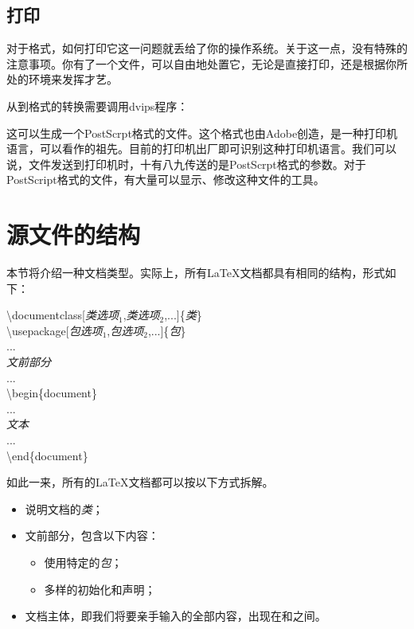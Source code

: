 \subsection{打印}

对于格式，如何打印它这一问题就丢给了你的操作系统。关于这一点，没有特殊的注意事项。你有了一个文件，可以自由地处置它，无论是直接打印，还是根据你所处的环境来发挥才艺。

\begin{exclamation}
    从到格式的转换需要调用dvips程序：


    这可以生成一个PostScrpt格式的文件。这个格式也由Adobe创造，是一种打印机语言，可以看作的祖先。目前的打印机出厂即可识别这种打印机语言。我们可以说，文件发送到打印机时，十有八九传送的是PostScrpt格式的参数。对于PostScript格式的文件，有大量可以显示、修改这种文件的工具。
\end{exclamation}

\section{源文件的结构}

本节将介绍一种文档类型。实际上，所有\LaTeX 文档都具有相同的结构，形式如下：

\begin{dmd}
\backslash documentclass[\textsl{\<类选项$_1$\>},\textsl{\<类选项$_2$\>},...]\{\textsl{\<类\>}\}\\
\backslash usepackage[\textsl{\<包选项$_1$\>},\textsl{\<包选项$_2$\>},...]\{\textsl{\<包\>}\}\\
...\\
\textsl{\<文前部分\>}\\
...\\
\backslash begin\{document\}\\
...\\
\textsl{\<文本\>}\\
...\\
\backslash end\{document\}
\end{dmd}

如此一来，所有的\LaTeX 文档都可以按以下方式拆解。

\begin{itemize}
    \item 说明文档的\textsl{\<类\>}；
    \item 文前部分，包含以下内容：
        \begin{itemize}
            \item 使用特定的\textsl{\<包\>}；
            \item 多样的初始化和声明；
        \end{itemize}
    \item 文档主体，即我们将要亲手输入的全部内容，出现在和之间。
\end{itemize}

